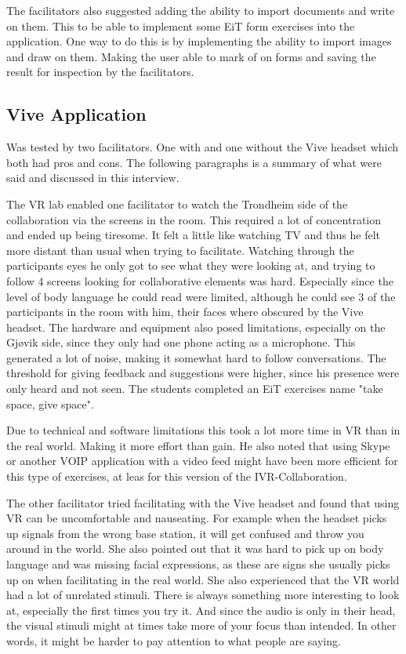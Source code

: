         The facilitators also suggested adding the ability to import documents and write on them. This to be able to implement some EiT form exercises into the application. One way to do this is by implementing the ability to import images and draw on them. Making the user able to mark of on forms and saving the result for inspection by the facilitators.
        
        \subsection{Vive Application} %
        Was tested by two facilitators. One with and one without the Vive headset which both had pros and cons. The following paragraphs is a summary of what were said and discussed in this interview.
        
        The VR lab enabled one facilitator to watch the Trondheim side of the collaboration via the screens in the room. This required a lot of concentration and ended up being tiresome. It felt a little like watching TV and thus he felt more distant than usual when trying to facilitate. Watching through the participants eyes he only got to see what they were looking at, and trying to follow 4 screens looking for collaborative elements was hard. Especially since the level of body language he could read were limited, although he could see 3 of the participants in the room with him, their faces where obscured by the Vive headset. The hardware and equipment also posed limitations, especially on the Gjøvik side, since they only had one phone acting as a microphone. This generated a lot of noise, making it somewhat hard to follow conversations. The threshold for giving feedback and suggestions were higher, since his presence were only heard and not seen. The students completed an EiT exercises name "take space, give space". 
        
        
        Due to technical and software limitations this took a lot more time in VR than in the real world. Making it more effort than gain. He also noted that using Skype or another VOIP application with a video feed might have been more efficient for this type of exercises, at leas for this version of the IVR-Collaboration.
        
        The other facilitator tried facilitating with the Vive headset and found that using VR can be uncomfortable and nauseating. For example when the headset picks up signals from the wrong base station, it will get confused and throw you around in the world. She also pointed out that it was hard to pick up on body language and was missing facial expressions, as these are signs she usually picks up on when facilitating in the real world. She also experienced that the VR world had a lot of unrelated stimuli. There is always something more interesting to look at, especially the first times you try it. And since the audio is only in their head, the visual stimuli might at times take more of your focus than intended. In other words, it might be harder to pay attention to what people are saying.
        
